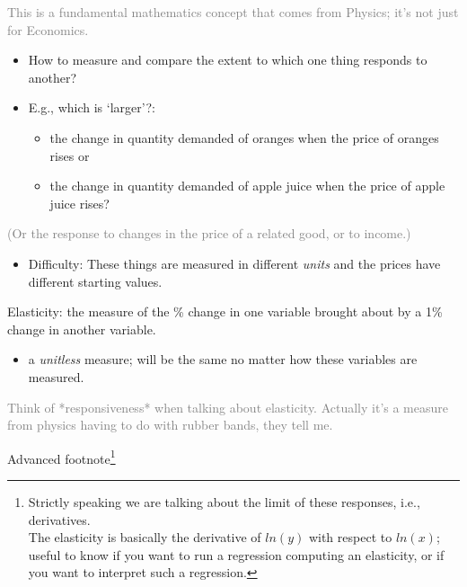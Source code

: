 \documentclass[]{article}
\providecommand{\tightlist}{%
  \setlength{\itemsep}{0pt}\setlength{\parskip}{0pt}}
\begin{document}
\textcolor{gray}{ This is a fundamental mathematics concept that comes from Physics;  it's not just for Economics.}

\begin{itemize}
\tightlist
\item
  How to measure and compare the extent to which one thing responds to
  another?
\item
  E.g., which is `larger'?:

  \begin{itemize}
  \tightlist
  \item
    the change in quantity demanded of oranges when the price of oranges
    rises or
  \item
    the change in quantity demanded of apple juice when the price of
    apple juice rises?
  \end{itemize}
\end{itemize}

\textcolor{gray}{(Or the response to changes in the price of a related good, or to income.)}

\begin{itemize}
\tightlist
\item
  Difficulty: These things are measured in different \emph{units} and
  the prices have different starting values.
\end{itemize}

\bigskip

Elasticity: the measure of the \% change in one variable brought about
by a 1\% change in another variable.

\begin{itemize}
\tightlist
\item
  a \emph{unitless} measure; will be the same no matter how these
  variables are measured.
\end{itemize}

\textcolor{gray}{Think of *responsiveness* when talking about elasticity. Actually it's a measure from physics having to do with rubber bands, they tell me.}

\textcolor{RawSienna}{Advanced footnote}\footnote{Strictly speaking we
  are talking about the limit of these responses, i.e., derivatives.\\
  The elasticity is basically the derivative of \(ln(y)\) with respect
  to \(ln(x)\); useful to know if you want to run a regression computing
  an elasticity, or if you want to interpret such a regression.}

\bigskip
\end{document}
